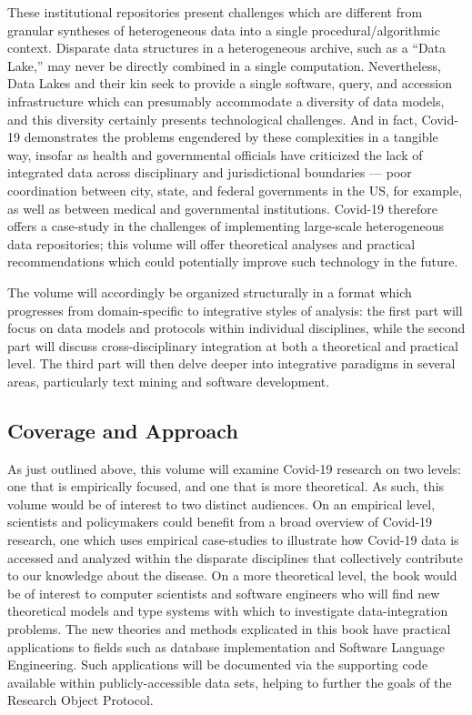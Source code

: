 \documentclass{statsoc}
\newcommand{\p}[1]{

\vspace{.75em}#1}
\newcommand{\q}[1]{{\fontfamily{qcr}\selectfont ``}#1{\fontfamily{qcr}\selectfont ''}}
\begin{document}
{\p{These institutional repositories present 
challenges which are different from granular 
syntheses of heterogeneous data into a single 
procedural/algorithmic context.  Disparate data structures 
in a heterogeneous archive, such as a \q{Data Lake,} may 
never be directly combined in a single computation.  
Nevertheless, Data Lakes and their kin seek to 
provide a single software, query, and accession infrastructure 
which can presumably accommodate a diversity of data models, and 
this diversity certainly presents technological challenges.  
And in fact, Covid-19 demonstrates the problems 
engendered by these complexities in a tangible way, 
insofar as health and governmental officials have criticized 
the lack of integrated data across disciplinary and 
jurisdictional boundaries --- poor coordination between 
city, state, and federal governments in the US, for 
example, as well as between medical and governmental institutions.  
Covid-19 therefore offers a case-study in the challenges of implementing large-scale heterogeneous
data repositories; this volume will offer theoretical 
analyses and practical recommendations which
could potentially improve such technology in the future.} 

\p{The volume will accordingly be organized structurally in a 
format which progresses from domain-specific to integrative 
styles of analysis: the first part will focus on data 
models and protocols within individual disciplines, 
while the second part will discuss 
cross-disciplinary integration at both a theoretical and 
practical level.  The third part will then delve deeper 
into integrative paradigms in several areas, particularly 
text mining and software development.}  

\subsection{Coverage and Approach}

\p{As just outlined above, this volume will examine 
Covid-19 research on two levels: one that is  
empirically focused, and one that is more theoretical.  As 
such, this volume would be of interest 
to two distinct audiences.  On an empirical level, 
scientists and policymakers could benefit 
from a broad overview of Covid-19 research, 
one which uses empirical case-studies to 
illustrate how Covid-19 data is accessed and 
analyzed within the disparate disciplines that 
collectively contribute to our knowledge 
about the disease.  On a more theoretical 
level, the book would be of interest to 
computer scientists and software engineers 
who will find new theoretical models and 
type systems with which to investigate 
data-integration problems.  The new 
theories and methods explicated in this book have practical 
applications to fields such as database implementation and 
Software Language Engineering.  Such applications will be 
documented via the supporting code available 
within publicly-accessible data sets, helping 
to further the goals of the Research Object Protocol.}

}
\end{document}
